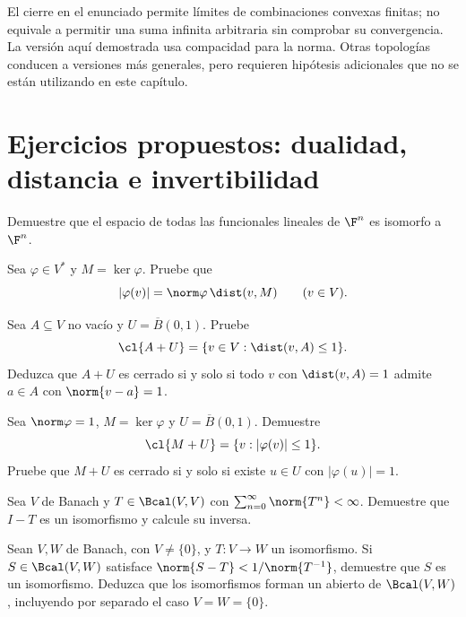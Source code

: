 El cierre en el enunciado permite límites de combinaciones convexas finitas; no equivale a permitir una suma infinita arbitraria sin comprobar su convergencia. La versión aquí demostrada usa compacidad para la norma. Otras topologías conducen a versiones más generales, pero requieren hipótesis adicionales que no se están utilizando en este capítulo.

\section{Ejercicios propuestos: dualidad, distancia e invertibilidad}

\begin{ejercicio}\label{ej:lectura-21-1}
Demuestre que el espacio de todas las funcionales lineales de $\F^n$ es isomorfo a $\F^n$.
\end{ejercicio}


\begin{ejercicio}\label{ej:lectura-21-2}
Sea $\varphi\in V^*$ y $M=\ker\varphi$. Pruebe que
\[|\varphi(v)|=\norm\varphi\,\dist(v,M)\qquad(v\in V).\]
\end{ejercicio}


\begin{ejercicio}\label{ej:lectura-21-3}
Sea $A\subseteq V$ no vacío y $U=\overline B(0,1)$. Pruebe
\[
 \cl{A+U}=\{v\in V:\dist(v,A)\leq1\}.
\]
Deduzca que $A+U$ es cerrado si y solo si todo $v$ con $\dist(v,A)=1$ admite $a\in A$ con $\norm{v-a}=1$.
\end{ejercicio}


\begin{ejercicio}\label{ej:lectura-21-4}
Sea $\norm\varphi=1$, $M=\ker\varphi$ y $U=\overline B(0,1)$. Demuestre
\[
 \cl{M+U}=\{v:|\varphi(v)|\leq1\}.
\]
Pruebe que $M+U$ es cerrado si y solo si existe $u\in U$ con $|\varphi(u)|=1$.
\end{ejercicio}


\begin{ejercicio}\label{ej:lectura-21-5}
Sea $V$ de Banach y $T\in\Bcal(V,V)$ con $\sum_{n=0}^{\infty}\norm{T^n}<\infty$. Demuestre que $I-T$ es un isomorfismo y calcule su inversa.
\end{ejercicio}


\begin{ejercicio}\label{ej:lectura-21-6}
Sean $V,W$ de Banach, con $V\ne\{0\}$, y $T:V\to W$ un isomorfismo. Si $S\in\Bcal(V,W)$ satisface $\norm{S-T}<1/\norm{T^{-1}}$, demuestre que $S$ es un isomorfismo. Deduzca que los isomorfismos forman un abierto de $\Bcal(V,W)$, incluyendo por separado el caso $V=W=\{0\}$.
\end{ejercicio}


